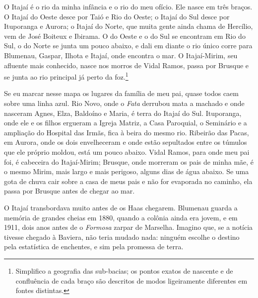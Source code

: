 \documentclass[
  brazilian,
  11pt,
  openany]{book}
\begin{document}
O Itajaí é o rio da minha infância e o rio do meu ofício. Ele nasce em
três braços. O Itajaí do Oeste desce por Taió e Rio do Oeste; o Itajaí
do Sul desce por Ituporanga e Aurora; o Itajaí do Norte, que muita gente
ainda chama de Hercílio, vem de José Boiteux e Ibirama. O do Oeste e o
do Sul se encontram em Rio do Sul, o do Norte se junta um pouco abaixo,
e dali em diante o rio único corre para Blumenau, Gaspar, Ilhota e
Itajaí, onde encontra o mar. O Itajaí-Mirim, seu afluente mais
conhecido, nasce nos morros de Vidal Ramos, passa por Brusque e se junta
ao rio principal já perto da foz.\footnote{Simplifico a geografia das
  sub-bacias; os pontos exatos de nascente e de confluência de cada
  braço são descritos de modos ligeiramente diferentes em fontes
  distintas.}

Se eu marcar nesse mapa os lugares da família de meu pai, quase todos
caem sobre uma linha azul. Rio Novo, onde o \emph{Fata} derrubou mata a
machado e onde nasceram Agnes, Elza, Baldoíno e Maria, é terra do Itajaí
do Sul. Ituporanga, onde ele e os filhos ergueram a Igreja Matriz, a
Casa Paroquial, o Seminário e a ampliação do Hospital das Irmãs, fica à
beira do mesmo rio. Ribeirão das Pacas, em Aurora, onde os dois
envelheceram e onde estão sepultados entre os túmulos que ele próprio
moldou, está um pouco abaixo. Vidal Ramos, para onde meu pai foi, é
cabeceira do Itajaí-Mirim; Brusque, onde morreram os pais de minha mãe,
é o mesmo Mirim, mais largo e mais perigoso, alguns dias de água abaixo.
Se uma gota de chuva cair sobre a casa de meus pais e não for evaporada
no caminho, ela passa por Brusque antes de chegar ao mar.

O Itajaí transbordava muito antes de os Haas chegarem. Blumenau guarda a
memória de grandes cheias em 1880, quando a colônia ainda era jovem, e
em 1911, dois anos antes de o \emph{Formosa} zarpar de Marselha. Imagino
que, se a notícia tivesse chegado à Baviera, não teria mudado nada:
ninguém escolhe o destino pela estatística de enchentes, e sim pela
promessa de terra.
\end{document}
